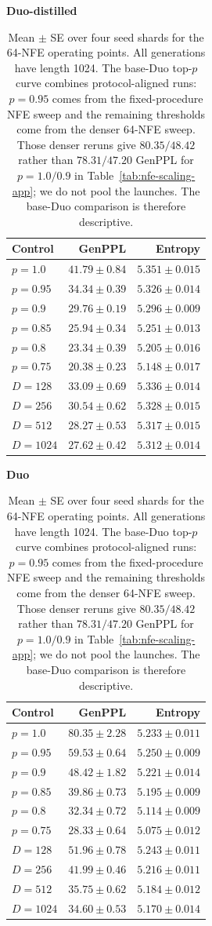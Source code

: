 \documentclass{article}
\newcommand{\1}{\mathbf 1}
\theoremstyle{definition}
\begin{document}
\begin{table}[H]
\centering
\footnotesize
\begin{minipage}[t]{0.48\linewidth}
\centering
\textbf{Duo-distilled}\\[2pt]
\begin{tabular}{@{}lrr@{}}
\toprule
Control & GenPPL & Entropy \\
\midrule
$p=1.0$ & $41.79\pm0.84$ & $5.351\pm0.015$ \\
$p=0.95$ & $34.34\pm0.39$ & $5.326\pm0.014$ \\
$p=0.9$ & $29.76\pm0.19$ & $5.296\pm0.009$ \\
$p=0.85$ & $25.94\pm0.34$ & $5.251\pm0.013$ \\
$p=0.8$ & $23.34\pm0.39$ & $5.205\pm0.016$ \\
$p=0.75$ & $20.38\pm0.23$ & $5.148\pm0.017$ \\
\midrule
$D=128$ & $33.09\pm0.69$ & $5.336\pm0.014$ \\
$D=256$ & $30.54\pm0.62$ & $5.328\pm0.015$ \\
$D=512$ & $28.27\pm0.53$ & $5.317\pm0.015$ \\
$D=1024$ & $27.62\pm0.42$ & $5.312\pm0.014$ \\
\bottomrule
\end{tabular}
\end{minipage}
\hfill
\begin{minipage}[t]{0.48\linewidth}
\centering
\textbf{Duo}\\[2pt]
\begin{tabular}{@{}lrr@{}}
\toprule
Control & GenPPL & Entropy \\
\midrule
$p=1.0$ & $80.35\pm2.28$ & $5.233\pm0.011$ \\
$p=0.95$ & $59.53\pm0.64$ & $5.250\pm0.009$ \\
$p=0.9$ & $48.42\pm1.82$ & $5.221\pm0.014$ \\
$p=0.85$ & $39.86\pm0.73$ & $5.195\pm0.009$ \\
$p=0.8$ & $32.34\pm0.72$ & $5.114\pm0.009$ \\
$p=0.75$ & $28.33\pm0.64$ & $5.075\pm0.012$ \\
\midrule
$D=128$ & $51.96\pm0.78$ & $5.243\pm0.011$ \\
$D=256$ & $41.99\pm0.46$ & $5.216\pm0.011$ \\
$D=512$ & $35.75\pm0.62$ & $5.184\pm0.012$ \\
$D=1024$ & $34.60\pm0.53$ & $5.170\pm0.014$ \\
\bottomrule
\end{tabular}
\end{minipage}
\caption{Mean $\pm$ SE over four seed shards for the 64-NFE operating points.
All generations have length 1024. The base-Duo top-$p$ curve combines
protocol-aligned runs: $p=0.95$ comes from the fixed-procedure NFE sweep and
the remaining thresholds come from the denser 64-NFE sweep. Those denser reruns
give $80.35/48.42$ rather than $78.31/47.20$ GenPPL for $p=1.0/0.9$ in
Table~\ref{tab:nfe-scaling-app}; we do not pool the launches. The base-Duo
comparison is therefore descriptive.}
\label{tab:frontier-values-app}
\end{table}
\end{document}
